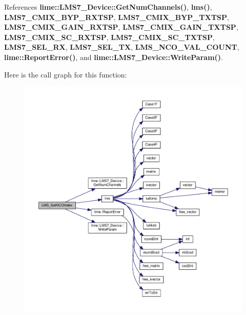 References {\bf lime\+::\+L\+M\+S7\+\_\+\+Device\+::\+Get\+Num\+Channels()}, {\bf lms()}, {\bf L\+M\+S7\+\_\+\+C\+M\+I\+X\+\_\+\+B\+Y\+P\+\_\+\+R\+X\+T\+SP}, {\bf L\+M\+S7\+\_\+\+C\+M\+I\+X\+\_\+\+B\+Y\+P\+\_\+\+T\+X\+T\+SP}, {\bf L\+M\+S7\+\_\+\+C\+M\+I\+X\+\_\+\+G\+A\+I\+N\+\_\+\+R\+X\+T\+SP}, {\bf L\+M\+S7\+\_\+\+C\+M\+I\+X\+\_\+\+G\+A\+I\+N\+\_\+\+T\+X\+T\+SP}, {\bf L\+M\+S7\+\_\+\+C\+M\+I\+X\+\_\+\+S\+C\+\_\+\+R\+X\+T\+SP}, {\bf L\+M\+S7\+\_\+\+C\+M\+I\+X\+\_\+\+S\+C\+\_\+\+T\+X\+T\+SP}, {\bf L\+M\+S7\+\_\+\+S\+E\+L\+\_\+\+RX}, {\bf L\+M\+S7\+\_\+\+S\+E\+L\+\_\+\+TX}, {\bf L\+M\+S\+\_\+\+N\+C\+O\+\_\+\+V\+A\+L\+\_\+\+C\+O\+U\+NT}, {\bf lime\+::\+Report\+Error()}, and {\bf lime\+::\+L\+M\+S7\+\_\+\+Device\+::\+Write\+Param()}.



Here is the call graph for this function\+:
\nopagebreak
\begin{figure}[H]
\begin{center}
\leavevmode
\includegraphics[width=350pt]{df/de1/lms7__api_8cpp_ab513c5ce7137992cc694dbd645e14444_cgraph}
\end{center}
\end{figure}


